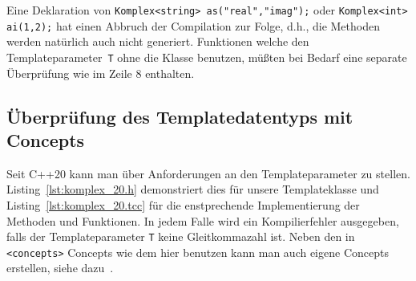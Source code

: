 Eine Deklaration von \verb|Komplex<string> as("real","imag");| oder \verb|Komplex<int> ai(1,2);|
hat einen Abbruch der Compilation zur Folge, d.h., die Methoden werden natürlich auch nicht generiert.
Funktionen welche den Templateparameter~\verb|T| ohne die Klasse benutzen, müßten bei Bedarf eine separate Überprüfung wie im Zeile 8 enthalten.

\subsection{Überprüfung des Templatedatentyps mit Concepts}
\label{p:10.3.1}
Seit C++20 kann man über  
Anforderungen an den Templateparameter zu stellen. 
Listing~\ref{lst:komplex_20.h} demonstriert dies für unsere Templateklasse und Listing~\ref{lst:komplex_20.tcc} 
für die enstprechende Implementierung der Methoden und Funktionen. In jedem Falle wird ein Kompilierfehler ausgegeben, falls der Templateparameter \verb|T| keine Gleitkommazahl ist.
%
%
%
Neben den in \verb|<concepts>|  Concepts wie dem hier benutzen 
 kann man auch eigene Concepts erstellen, siehe dazu~\cite[p.10 and \S4.1]{Grimm:2021:CGD}. 
